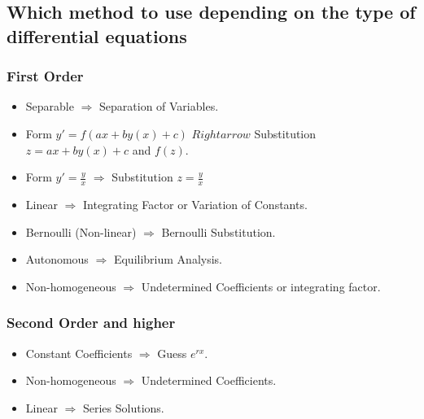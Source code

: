 \subsection{Which method to use depending on the type of differential equations}

\subsubsection{First Order}

\begin{itemize}

    \item Separable \(\Rightarrow\) Separation of Variables.

    \item Form \(y' = f(ax + by(x) + c)\) \(Rightarrow\) Substitution \(z = ax + by(x) + c\) and \(f(z)\).

    \item Form \(y' = \frac{y}{x}\) \(\Rightarrow\) Substitution \(z = \frac{y}{x}\)

    \item Linear \(\Rightarrow\) Integrating Factor or Variation of Constants.

    \item Bernoulli (Non-linear) \(\Rightarrow\) Bernoulli Substitution.

    \item Autonomous \(\Rightarrow\) Equilibrium Analysis.

    \item Non-homogeneous \(\Rightarrow\) Undetermined Coefficients or integrating factor.

\end{itemize}


\subsubsection{Second Order and higher}

\begin{itemize}

    \item Constant Coefficients \(\Rightarrow\) Guess \(e^{rx}\).

    \item Non-homogeneous \(\Rightarrow\) Undetermined Coefficients.

    \item Linear \(\Rightarrow\) Series Solutions.

\end{itemize}

